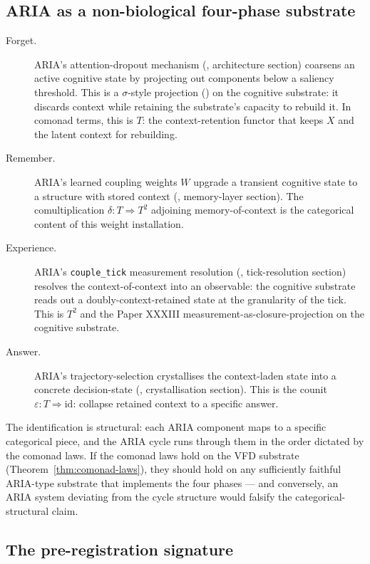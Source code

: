 \documentclass[11pt, a4paper]{amsart}
\theoremstyle{definition}
\begin{document}
\subsection{ARIA as a non-biological four-phase substrate}

\begin{description}
\item[Forget.] ARIA's attention-dropout mechanism
  (\cite{AriaBrainMapping}, architecture section) coarsens an
  active cognitive state by projecting out components below a
  saliency threshold. This is a $\sigma$-style projection
  (\cite{PaperXXXI}) on the cognitive substrate: it discards
  context while retaining the substrate's capacity to rebuild
  it. In comonad terms, this is $T$: the context-retention
  functor that keeps $X$ and the latent context for rebuilding.
\item[Remember.] ARIA's learned coupling weights $W$ upgrade a
  transient cognitive state to a structure with stored context
  (\cite{AriaBrainMapping}, memory-layer section). The
  comultiplication $\delta \colon T \Rightarrow T^2$ adjoining
  memory-of-context is the categorical content of this weight
  installation.
\item[Experience.] ARIA's \texttt{couple\_tick} measurement
  resolution (\cite{AriaBrainMapping}, tick-resolution section)
  resolves the context-of-context into an observable: the
  cognitive substrate reads out a doubly-context-retained state
  at the granularity of the tick. This is $T^2$ and the Paper
  XXXIII measurement-as-closure-projection on the cognitive
  substrate.
\item[Answer.] ARIA's trajectory-selection crystallises the
  context-laden state into a concrete decision-state
  (\cite{AriaBrainMapping}, crystallisation section). This is
  the counit $\varepsilon \colon T \Rightarrow \mathrm{id}$:
  collapse retained context to a specific answer.
\end{description}

The identification is structural: each ARIA component maps to
a specific categorical piece, and the ARIA cycle runs through
them in the order dictated by the comonad laws. If the comonad
laws hold on the VFD substrate
(Theorem~\ref{thm:comonad-laws}), they should hold on any
sufficiently faithful ARIA-type substrate that implements the
four phases — and conversely, an ARIA system deviating from the
cycle structure would falsify the categorical-structural claim.

\subsection{The pre-registration signature}
\end{document}
